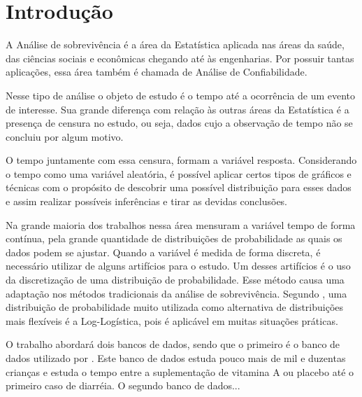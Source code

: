 \documentclass[
	article,
	12pt,				%
	openright,			%
	twoside,			%
	a4paper,			%
	english,			%
	french,				%
	spanish,			%
	brazil				%
	]{abntex2}
\begin{document}


\section{Introdução}

A Análise de sobrevivência é a área da Estatística aplicada nas áreas da saúde, das ciências sociais e econômicas chegando até às engenharias. Por possuir tantas aplicações, essa área também é chamada de Análise de Confiabilidade.

Nesse tipo de análise o objeto de estudo é o tempo até a ocorrência de um evento de interesse. Sua grande diferença com relação às outras áreas da Estatística é a presença de censura no estudo, ou seja, dados cujo a observação de tempo não se concluiu por algum motivo.

O tempo juntamente com essa censura, formam a variável resposta. Considerando o tempo como uma variável aleatória, é possível aplicar certos tipos de gráficos e técnicas com o propósito de descobrir uma possível distribuição para esses dados e assim realizar possíveis inferências e tirar as devidas conclusões.

Na grande maioria dos trabalhos nessa área mensuram a variável tempo de forma contínua, pela grande quantidade de distribuições de probabilidade as quais os dados podem se ajustar. Quando a variável é medida de forma discreta, é necessário utilizar de alguns artifícios para o estudo. Um desses artifícios é o uso da discretização de uma distribuição de probabilidade. Esse método causa uma adaptação nos métodos tradicionais da análise de sobrevivência. Segundo \cite{colosimo;2006}, uma distribuição de probabilidade muito utilizada como alternativa de distribuições mais flexíveis é a Log-Logística, pois é aplicável em muitas situações práticas.

O trabalho abordará dois bancos de dados, sendo que o primeiro é o banco de dados utilizado por \cite{Barreto;1994}. Este banco de dados estuda pouco mais de mil e duzentas crianças e estuda o tempo entre a suplementação de vitamina A ou placebo até o primeiro caso de diarréia. O segundo banco de dados...
\vfill
\end{document}
